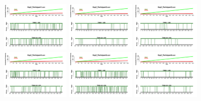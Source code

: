 \begin{figure}[th]
\centering
\includegraphics[width=0.30\textwidth]{Figures/Success_Exp2_P1} \includegraphics[width=0.30\textwidth]{Figures/Success_Exp2_P2} \includegraphics[width=0.30\textwidth]{Figures/Success_Exp2_P3}
\includegraphics[width=0.30\textwidth]{Figures/Success_Exp2_P4} \includegraphics[width=0.30\textwidth]{Figures/Success_Exp2_P5} \includegraphics[width=0.30\textwidth]{Figures/Success_Exp2_P6}

\end{figure}
